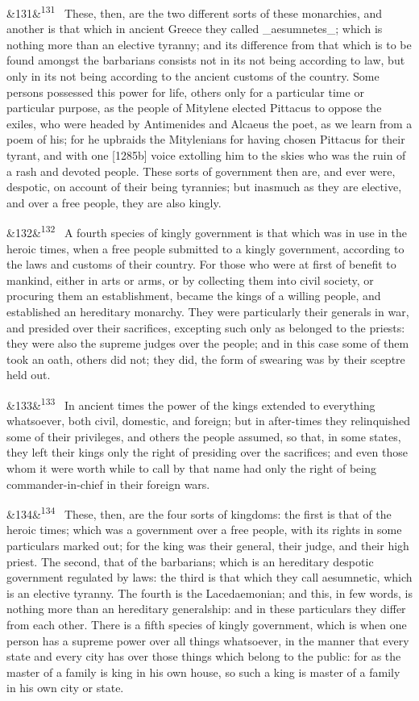 \documentclass[12pt]{article}
\newcommand{\para}[1][]{\par\noindent\ifx&#1&\else\textsuperscript{\footnotesize #1}~\fi}
\begin{document}
\para[131] These, then, are the two different sorts of these monarchies, and another is that which in ancient Greece they called \_aesumnetes\_; which is nothing more than an elective tyranny; and its difference from that which is to be found amongst the barbarians consists not in its not being according to law, but only in its not being according to the ancient customs of the country. Some persons possessed this power for life, others only for a particular time or particular purpose, as the people of Mitylene elected Pittacus to oppose the exiles, who were headed by Antimenides and Alcaeus the poet, as we learn from a poem of his; for he upbraids the Mitylenians for having chosen Pittacus for their tyrant, and with one [1285b] voice extolling him to the skies who was the ruin of a rash and devoted people. These sorts of government then are, and ever were, despotic, on account of their being tyrannies; but inasmuch as they are elective, and over a free people, they are also kingly.

\para[132] A fourth species of kingly government is that which was in use in the heroic times, when a free people submitted to a kingly government, according to the laws and customs of their country. For those who were at first of benefit to mankind, either in arts or arms, or by collecting them into civil society, or procuring them an establishment, became the kings of a willing people, and established an hereditary monarchy. They were particularly their generals in war, and presided over their sacrifices, excepting such only as belonged to the priests: they were also the supreme judges over the people; and in this case some of them took an oath, others did not; they did, the form of swearing was by their sceptre held out.

\para[133] In ancient times the power of the kings extended to everything whatsoever, both civil, domestic, and foreign; but in after-times they relinquished some of their privileges, and others the people assumed, so that, in some states, they left their kings only the right of presiding over the sacrifices; and even those whom it were worth while to call by that name had only the right of being commander-in-chief in their foreign wars.

\para[134] These, then, are the four sorts of kingdoms: the first is that of the heroic times; which was a government over a free people, with its rights in some particulars marked out; for the king was their general, their judge, and their high priest. The second, that of the barbarians; which is an hereditary despotic government regulated by laws: the third is that which they call aesumnetic, which is an elective tyranny. The fourth is the Lacedaemonian; and this, in few words, is nothing more than an hereditary generalship: and in these particulars they differ from each other. There is a fifth species of kingly government, which is when one person has a supreme power over all things whatsoever, in the manner that every state and every city has over those things which belong to the public: for as the master of a family is king in his own house, so such a king is master of a family in his own city or state.
\end{document}
